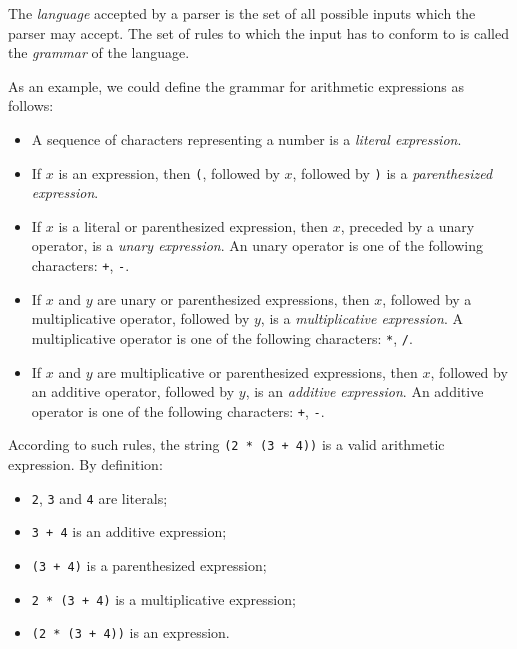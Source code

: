 \documentclass[11pt, american, draft]{PhdThesis}
\begin{document}
  The \emph{language} accepted by a parser is the set of all possible inputs which the parser may
  accept. The set of rules to which the input has to conform to is called the \emph{grammar} of the
  language.

  As an example, we could define the grammar for arithmetic expressions as follows:

  \begin{itemize}[noitemsep,topsep=0pt]
    \item A sequence of characters representing a number is a \emph{literal expression}.

    \item If $x$ is an expression, then \verb$($, followed by $x$, followed by \verb$)$ is a
          \emph{parenthesized expression}.

    \item If $x$ is a literal or parenthesized expression, then $x$, preceded by a unary operator,
          is a \emph{unary expression}. An unary operator is one of the following characters:
          \verb$+$, \verb$-$.

    \item If $x$ and $y$ are unary or parenthesized expressions, then $x$, followed by a
          multiplicative operator, followed by $y$, is a \emph{multiplicative expression}. A
          multiplicative operator is one of the following characters: \verb$*$, \verb$/$.

    \item If $x$ and $y$ are multiplicative or parenthesized expressions, then $x$, followed by an
          additive operator, followed by $y$, is an \emph{additive expression}. An additive operator
          is one of the following characters: \verb$+$, \verb$-$.
  \end{itemize}

  According to such rules, the string \verb$(2 * (3 + 4))$ is a valid arithmetic expression. By
  definition:

  \begin{itemize}[noitemsep,topsep=0pt]
    \item \verb$2$, \verb$3$ and \verb$4$ are literals;
    \item \verb$3 + 4$ is an additive expression;
    \item \verb$(3 + 4)$ is a parenthesized expression;
    \item \verb$2 * (3 + 4)$ is a multiplicative expression;
    \item \verb$(2 * (3 + 4))$ is an expression.
  \end{itemize}
\end{document}
